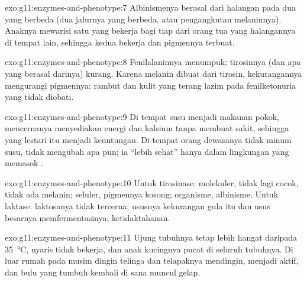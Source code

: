 \begin{solution}{exo:g11:enzymes-and-phenotype:7}
Albinismenya berasal dari halangan pada dua  yang berbeda (dua 
jalurnya yang berbeda, atau pengangkutan melaninnya). Anaknya mewarisi
satu  yang bekerja bagi tiap  dari orang tua yang halangannya
di tempat lain, sehingga kedua  bekerja dan pigmennya terbuat.
\end{solution}

\begin{solution}{exo:g11:enzymes-and-phenotype:8}
Fenilalaninnya menumpuk; tirosinnya (dan apa yang berasal darinya)
kurang. Karena melanin dibuat dari tirosin, kekurangannya mengurangi
pigmennya: rambut dan kulit yang terang lazim pada fenilketonuria yang
tidak diobati.
\end{solution}

\begin{solution}{exo:g11:enzymes-and-phenotype:9}
Di tempat susu menjadi makanan pokok, mencernanya menyediakan energi
dan kalsium tanpa membuat sakit, sehingga  yang lestari itu menjadi
keuntungan. Di tempat orang dewasanya tidak minum susu,  tidak
mengubah apa pun; ia ``lebih sehat'' hanya dalam lingkungan yang
memasok .
\end{solution}

\begin{solution}{exo:g11:enzymes-and-phenotype:10}
Untuk tirosinase: molekuler,  tidak lagi cocok, tidak ada
melanin; seluler,  pigmennya kosong; organisme, albinisme. Untuk
laktase: laktosanya tidak tercerna;  ususnya kekurangan gula itu dan
usus besarnya memfermentasinya; ketidaktahanan.
\end{solution}

\begin{solution}{exo:g11:enzymes-and-phenotype:11}
Ujung tubuhnya tetap lebih hangat daripada \qty{35}{\celsius},
 nyaris tidak bekerja, dan anak kucingnya pucat di seluruh
tubuhnya. Di luar rumah pada musim dingin telinga dan telapaknya
mendingin,  menjadi aktif, dan bulu yang tumbuh kembali di sana
muncul gelap.
\end{solution}

